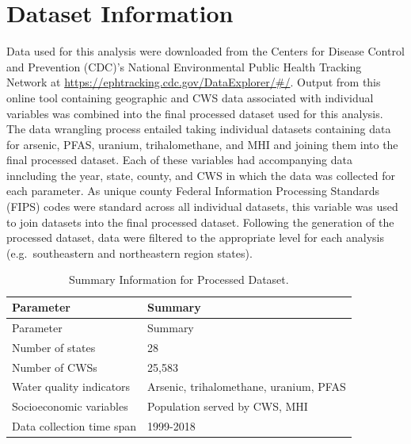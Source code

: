 \documentclass[12pt,]{article}
\begin{document}
\newpage

\hypertarget{dataset-information}{%
\section{Dataset Information}\label{dataset-information}}

Data used for this analysis were downloaded from the Centers for Disease
Control and Prevention (CDC)'s National Environmental Public Health
Tracking Network at \url{https://ephtracking.cdc.gov/DataExplorer/\#/}.
Output from this online tool containing geographic and CWS data
associated with individual variables was combined into the final
processed dataset used for this analysis.\\
The data wrangling process entailed taking individual datasets
containing data for arsenic, PFAS, uranium, trihalomethane, and MHI and
joining them into the final processed dataset. Each of these variables
had accompanying data inncluding the year, state, county, and CWS in
which the data was collected for each parameter. As unique county
Federal Information Processing Standards (FIPS) codes were standard
across all individual datasets, this variable was used to join datasets
into the final processed dataset. Following the generation of the
processed dataset, data were filtered to the appropriate level for each
analysis (e.g.~southeastern and northeastern region states).

\begin{quote}
\end{quote}

\begin{longtable}[]{@{}ll@{}}
\caption{Summary Information for Processed Dataset.}\tabularnewline
\toprule
Parameter & Summary\tabularnewline
\midrule
\endfirsthead
\toprule
Parameter & Summary\tabularnewline
\midrule
\endhead
Number of states & 28\tabularnewline
Number of CWSs & 25,583\tabularnewline
Water quality indicators & Arsenic, trihalomethane, uranium,
PFAS\tabularnewline
Socioeconomic variables & Population served by CWS, MHI\tabularnewline
Data collection time span & 1999-2018\tabularnewline
\bottomrule
\end{longtable}
\end{document}
